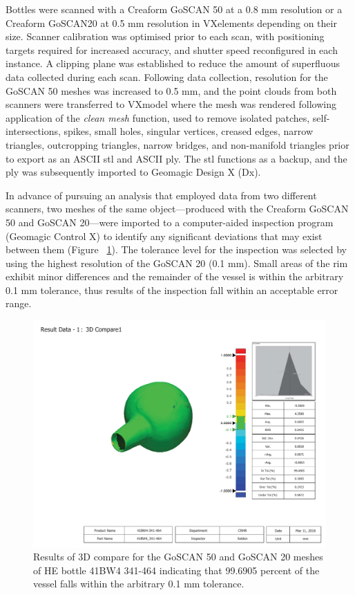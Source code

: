 \documentclass[review]{elsarticle}
\begin{document}
Bottles were scanned with a Creaform GoSCAN 50 at a 0.8 mm resolution or a Creaform GoSCAN20 at 0.5 mm resolution in VXelements depending on their size. Scanner calibration was optimised prior to each scan, with positioning targets required for increased accuracy, and shutter speed reconfigured in each instance. A clipping plane was established to reduce the amount of superfluous data collected during each scan. Following data collection, resolution for the GoSCAN 50 meshes was increased to 0.5 mm, and the point clouds from both scanners were transferred to VXmodel where the mesh was rendered following application of the \textit{clean mesh} function, used to remove isolated patches, self-intersections, spikes, small holes, singular vertices, creased edges, narrow triangles, outcropping triangles, narrow bridges, and non-manifold triangles prior to export as an ASCII stl and ASCII ply. The stl functions as a backup, and the ply was subsequently imported to Geomagic Design X (Dx).

In advance of pursuing an analysis that employed data from two different scanners, two meshes of the same object---produced with the Creaform GoSCAN 50 and GoSCAN 20---were imported to a computer-aided inspection program (Geomagic Control X) to identify any significant deviations that may exist between them (Figure ~\ref{fig:comparecx}). The tolerance level for the inspection was selected by using the highest resolution of the GoSCAN 20 (0.1 mm). Small areas of the rim exhibit minor differences and the remainder of the vessel is within the arbitrary 0.1 mm tolerance, thus results of the inspection fall within an acceptable error range.

\begin{figure}[ht]\centering
\includegraphics[width=\linewidth]{compare}
\caption{Results of 3D compare for the GoSCAN 50 and GoSCAN 20 meshes of HE bottle 41BW4 341-464 indicating that 99.6905 percent of the vessel falls within the arbitrary 0.1 mm tolerance.}
\label{fig:comparecx}
\end{figure}
 
\end{document}
